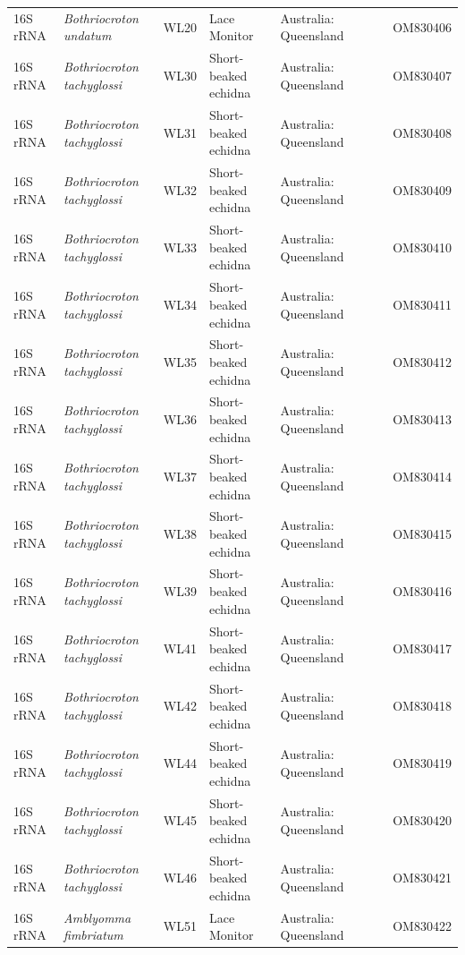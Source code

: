 \documentclass[a4paper, nobind]{templates/ociamthesis}
\begin{document}
\begin{landscape}
\begin{longtable}[t]{l>{}lllllll}
16S rRNA & \em{Bothriocroton undatum} & WL20 & Lace Monitor & Australia: Queensland &  &  & OM830406\\
16S rRNA & \em{Bothriocroton tachyglossi} & WL30 & Short-beaked echidna & Australia: Queensland &  &  & OM830407\\
16S rRNA & \em{Bothriocroton tachyglossi} & WL31 & Short-beaked echidna & Australia: Queensland &  &  & OM830408\\
16S rRNA & \em{Bothriocroton tachyglossi} & WL32 & Short-beaked echidna & Australia: Queensland &  &  & OM830409\\
16S rRNA & \em{Bothriocroton tachyglossi} & WL33 & Short-beaked echidna & Australia: Queensland &  &  & OM830410\\
16S rRNA & \em{Bothriocroton tachyglossi} & WL34 & Short-beaked echidna & Australia: Queensland &  &  & OM830411\\
16S rRNA & \em{Bothriocroton tachyglossi} & WL35 & Short-beaked echidna & Australia: Queensland &  &  & OM830412\\
16S rRNA & \em{Bothriocroton tachyglossi} & WL36 & Short-beaked echidna & Australia: Queensland &  &  & OM830413\\
16S rRNA & \em{Bothriocroton tachyglossi} & WL37 & Short-beaked echidna & Australia: Queensland &  &  & OM830414\\
16S rRNA & \em{Bothriocroton tachyglossi} & WL38 & Short-beaked echidna & Australia: Queensland &  &  & OM830415\\
16S rRNA & \em{Bothriocroton tachyglossi} & WL39 & Short-beaked echidna & Australia: Queensland &  &  & OM830416\\
16S rRNA & \em{Bothriocroton tachyglossi} & WL41 & Short-beaked echidna & Australia: Queensland &  &  & OM830417\\
16S rRNA & \em{Bothriocroton tachyglossi} & WL42 & Short-beaked echidna & Australia: Queensland &  &  & OM830418\\
16S rRNA & \em{Bothriocroton tachyglossi} & WL44 & Short-beaked echidna & Australia: Queensland &  &  & OM830419\\
16S rRNA & \em{Bothriocroton tachyglossi} & WL45 & Short-beaked echidna & Australia: Queensland &  &  & OM830420\\
16S rRNA & \em{Bothriocroton tachyglossi} & WL46 & Short-beaked echidna & Australia: Queensland &  &  & OM830421\\
16S rRNA & \em{Amblyomma fimbriatum} & WL51 & Lace Monitor & Australia: Queensland &  &  & OM830422\\

\end{longtable}
\end{landscape}
\end{document}
